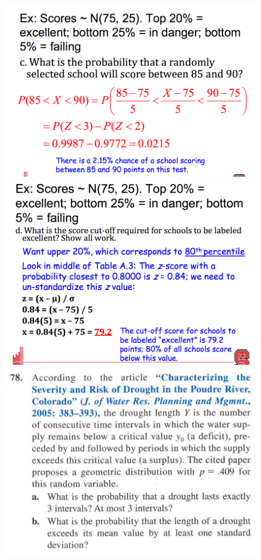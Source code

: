 \documentclass[9pt]{extarticle}
\begin{document}
	\includegraphics[scale=0.15]{3.png} \includegraphics[scale=0.15]{4.png}
	\includegraphics[scale=0.25]{78.png} 
	
\end{document}
